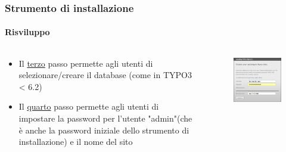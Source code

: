 
\begin{frame}[fragile]
	\frametitle{Strumento di installazione}
	\framesubtitle{Risviluppo}

	\begin{columns}[T]

		\begin{column}{.5\textwidth}
			\begin{itemize}
				\item Il \underline{terzo} passo permette agli utenti di selezionare/creare il database\newline
					(come in TYPO3 < 6.2)
				\item Il \underline{quarto} passo permette agli utenti di impostare la password per l'utente "admin"\newline (che è anche la password iniziale dello strumento di installazione) e il nome del sito
			\end{itemize}
		\end{column}

		\begin{column}{.5\textwidth}
			\begin{figure}\vspace*{-0.4cm}
				\includegraphics[width=0.8\linewidth]{Images/InstallTool/AdminPasswordAndSiteName.png}
			\end{figure}
		\end{column}

	\end{columns}

\end{frame}

